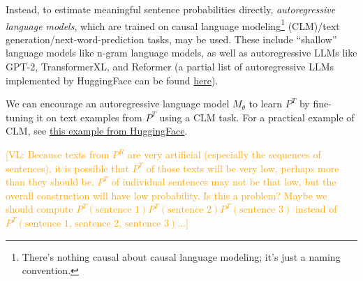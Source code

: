 \documentclass{article}
\newcommand{\vl}[1]{\textcolor{orange}{[VL: #1]}}
\begin{document}
Instead, to estimate meaningful sentence probabilities directly, \textit{autoregressive language models}, which are trained on causal language modeling\footnote{There's nothing causal about causal language modeling; it's just a naming convention.} (CLM)/text generation/next-word-prediction tasks, may be used. These include ``shallow'' language models like n-gram language models, as well as autoregressive LLMs like GPT-2, TransformerXL, and Reformer (a partial list of autoregressive LLMs implemented by HuggingFace can be found \href{https://web.archive.org/web/20230125132319/https://huggingface.co/docs/transformers/model_summary#autoregressive-models}{here}).

We can encourage an autoregressive language model $M_\theta$ to learn $P^T$ by fine-tuning it on text examples from $P^T$ using a CLM task. For a practical example of CLM, see \href{https://huggingface.co/docs/transformers/tasks/language_modeling}{this example from HuggingFace}.



\vl{Because texts from $P^R$ are very artificial (especially the sequences of sentences), it is possible that $P^T$ of those texts will be very low, perhaps more than they should be. $P^T$ of individual sentences may not be that low, but the overall construction will have low probability. Is this a problem? Maybe we should compute $P^T(\text{sentence 1})P^T(\text{sentence 2})P^T(\text{sentence 3})$ instead of $P^T(\text{sentence 1, sentence 2, sentence 3})$...}
\end{document}
